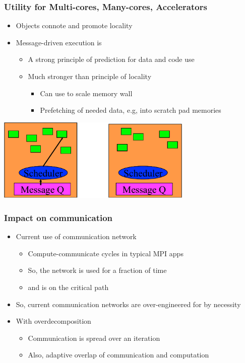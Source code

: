 \begin{frame}[t]
\frametitle{Utility for Multi-cores, Many-cores, Accelerators}
  \begin{itemize}
    \item Objects connote and promote locality
    \item Message-driven execution is
    \begin{itemize}
      \item A strong principle of prediction for data and code use
      \item Much stronger than principle of locality
      \begin{itemize}
        \item Can use to scale memory wall
        \item Prefetching of needed data, e.g, into scratch pad memories
      \end{itemize}
    \end{itemize}
  \end{itemize}
  \begin{center} \includegraphics[width=0.7\textwidth]{figures/scheduler} \end{center}
\end{frame}

\begin{frame}[t]
\frametitle{Impact on communication}
  \begin{itemize}
    \item Current use of communication network
    \begin{itemize}
      \item Compute-communicate cycles in typical MPI apps
      \item So, the network is used for a fraction of time
      \item and is on the critical path
    \end{itemize}
    \item So, current communication networks are over-engineered for by necessity
    \item With overdecomposition
    \begin{itemize}
      \item Communication is spread over an iteration
      \item Also, adaptive overlap of communication and computation
    \end{itemize}
  \end{itemize}
\end{frame}

